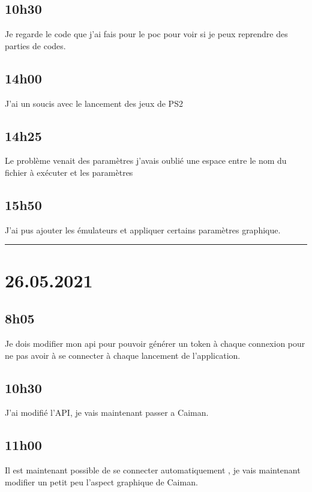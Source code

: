 \documentclass[a4paper,12pt,french]{sphinxmanual}
\begin{document}
\subsection{10h30}
\label{\detokenize{logbook:id151}}
\sphinxAtStartPar
Je regarde le code que j’ai fais pour le poc pour voir si je peux reprendre des parties de codes.


\subsection{14h00}
\label{\detokenize{logbook:id152}}
\sphinxAtStartPar
J’ai un soucis avec le lancement des jeux de PS2


\subsection{14h25}
\label{\detokenize{logbook:id153}}
\sphinxAtStartPar
Le problème venait des paramètres j’avais oublié une espace entre le nom du fichier à exécuter et les paramètres


\subsection{15h50}
\label{\detokenize{logbook:id154}}
\sphinxAtStartPar
J’ai pus ajouter les émulateurs et appliquer certains paramètres graphique.


\bigskip\hrule\bigskip



\section{26.05.2021}
\label{\detokenize{logbook:id155}}

\subsection{8h05}
\label{\detokenize{logbook:id156}}
\sphinxAtStartPar
Je dois modifier mon api pour pouvoir générer un token à chaque connexion pour ne pas avoir à se connecter à chaque lancement de l’application.


\subsection{10h30}
\label{\detokenize{logbook:id157}}
\sphinxAtStartPar
J’ai modifié l’API, je vais maintenant passer a Caiman.


\subsection{11h00}
\label{\detokenize{logbook:id158}}
\sphinxAtStartPar
Il est maintenant possible de se connecter automatiquement , je vais maintenant modifier un petit peu l’aspect graphique de Caiman.
\end{document}
